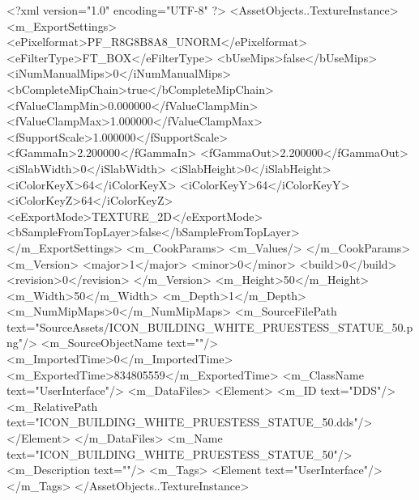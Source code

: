 <?xml version="1.0" encoding="UTF-8" ?>
<AssetObjects..TextureInstance>
	<m_ExportSettings>
		<ePixelformat>PF_R8G8B8A8_UNORM</ePixelformat>
		<eFilterType>FT_BOX</eFilterType>
		<bUseMips>false</bUseMips>
		<iNumManualMips>0</iNumManualMips>
		<bCompleteMipChain>true</bCompleteMipChain>
		<fValueClampMin>0.000000</fValueClampMin>
		<fValueClampMax>1.000000</fValueClampMax>
		<fSupportScale>1.000000</fSupportScale>
		<fGammaIn>2.200000</fGammaIn>
		<fGammaOut>2.200000</fGammaOut>
		<iSlabWidth>0</iSlabWidth>
		<iSlabHeight>0</iSlabHeight>
		<iColorKeyX>64</iColorKeyX>
		<iColorKeyY>64</iColorKeyY>
		<iColorKeyZ>64</iColorKeyZ>
		<eExportMode>TEXTURE_2D</eExportMode>
		<bSampleFromTopLayer>false</bSampleFromTopLayer>
	</m_ExportSettings>
	<m_CookParams>
		<m_Values/>
	</m_CookParams>
	<m_Version>
		<major>1</major>
		<minor>0</minor>
		<build>0</build>
		<revision>0</revision>
	</m_Version>
	<m_Height>50</m_Height>
	<m_Width>50</m_Width>
	<m_Depth>1</m_Depth>
	<m_NumMipMaps>0</m_NumMipMaps>
	<m_SourceFilePath text="SourceAssets/ICON_BUILDING_WHITE_PRUESTESS_STATUE_50.png"/>
	<m_SourceObjectName text=""/>
	<m_ImportedTime>0</m_ImportedTime>
	<m_ExportedTime>834805559</m_ExportedTime>
	<m_ClassName text="UserInterface"/>
	<m_DataFiles>
		<Element>
			<m_ID text="DDS"/>
			<m_RelativePath text="ICON_BUILDING_WHITE_PRUESTESS_STATUE_50.dds"/>
		</Element>
	</m_DataFiles>
	<m_Name text="ICON_BUILDING_WHITE_PRUESTESS_STATUE_50"/>
	<m_Description text=""/>
	<m_Tags>
		<Element text="UserInterface"/>
	</m_Tags>
</AssetObjects..TextureInstance>

